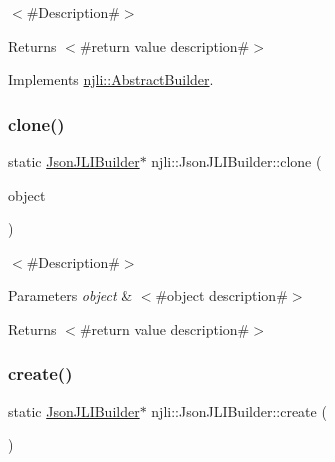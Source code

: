 $<$\#\+Description\#$>$

\begin{DoxyReturn}{Returns}
$<$\#return value description\#$>$ 
\end{DoxyReturn}


Implements \mbox{\hyperlink{classnjli_1_1_abstract_builder_aa1d220053e182c37b31b427499c6eacf}{njli\+::\+Abstract\+Builder}}.

\mbox{\label{classnjli_1_1_json_j_l_i_builder_ae11c119b938d58a4818b33dcd2bd58aa}} 
\subsubsection{\texorpdfstring{clone()}{clone()}}
{\footnotesize\ttfamily static \mbox{\hyperlink{classnjli_1_1_json_j_l_i_builder}{Json\+J\+L\+I\+Builder}}$\ast$ njli\+::\+Json\+J\+L\+I\+Builder\+::clone (\begin{DoxyParamCaption}\item[{const \mbox{\hyperlink{classnjli_1_1_json_j_l_i_builder}{Json\+J\+L\+I\+Builder}} \&}]{object }\end{DoxyParamCaption})\hspace{0.3cm}{\ttfamily [static]}}

$<$\#\+Description\#$>$


\begin{DoxyParams}{Parameters}
{\em object} & $<$\#object description\#$>$\\
\hline
\end{DoxyParams}
\begin{DoxyReturn}{Returns}
$<$\#return value description\#$>$ 
\end{DoxyReturn}
\mbox{\label{classnjli_1_1_json_j_l_i_builder_ab956ca1d3541404bac077d196774b404}} 
\subsubsection{\texorpdfstring{create()}{create()}}
{\footnotesize\ttfamily static \mbox{\hyperlink{classnjli_1_1_json_j_l_i_builder}{Json\+J\+L\+I\+Builder}}$\ast$ njli\+::\+Json\+J\+L\+I\+Builder\+::create (\begin{DoxyParamCaption}{ }\end{DoxyParamCaption})\hspace{0.3cm}{\ttfamily [static]}}

